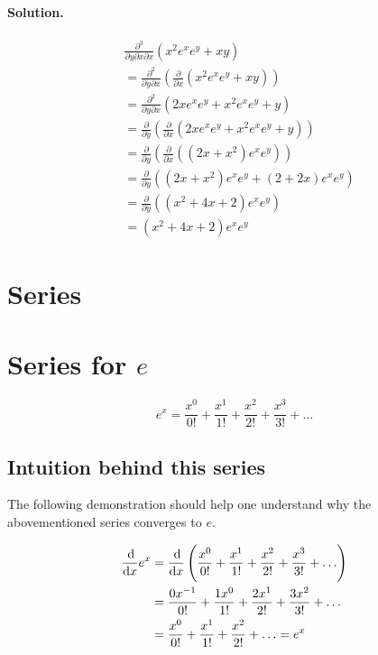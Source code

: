 \documentclass[oneside]{book}
\begin{document}
\paragraph{Solution.}
\begin{align*}
    &\frac{\partial^3}{\partial y \partial x \partial x} \left(x^2 e^x e^y + xy\right) \\
    &=\frac{\partial^2}{\partial y \partial x} \left(\frac{\partial}{\partial x} \left(x^2 e^x e^y + xy\right)\right) \\
    &=\frac{\partial^2}{\partial y \partial x} \left(2x e^x e^y + x^2 e^x e^y + y\right) \\
    &=\frac{\partial}{\partial y} \left(\frac{\partial}{\partial x} \left(2x e^x e^y + x^2 e^x e^y + y\right)\right) \\
    &=\frac{\partial}{\partial y} \left(\frac{\partial}{\partial x} \left(\left(2x + x^2\right) e^x e^y\right)\right) \\
    &=\frac{\partial}{\partial y} \left(\left(2x + x^2\right) e^x e^y + \left(2 + 2x\right) e^x e^y\right) \\
    &=\frac{\partial}{\partial y} \left(\left(x^2 + 4x + 2\right) e^x e^y\right) \\
    &= \left(x^2 + 4x + 2\right) e^x e^y
\end{align*}

\section{Series}
\section{Series for \(e\)}
\[e^x = \frac{x^0}{0!} + \frac{x^1}{1!} + \frac{x^2}{2!} + \frac{x^3}{3!} + \ldots\]

\subsection{Intuition behind this series}
The following demonstration should help one understand why the abovementioned
series converges to \(e\).

\begin{align*}
    \frac{\dif}{\dif x} e^x
    &= \frac{\dif}{\dif x} \left( \frac{x^0}{0!} + \frac{x^1}{1!} + \frac{x^2}{2!} + \frac{x^3}{3!} + \ldots \right) \\
    &= \frac{0 x^{-1}}{0!} + \frac{1 x^0}{1!} + \frac{2 x^1}{2!} + \frac{3 x^2}{3!} + \ldots \\
    &= \frac{x^0}{0!} + \frac{x^1}{1!} + \frac{x^2}{2!} + \ldots = e^x
\end{align*}
\end{document}
